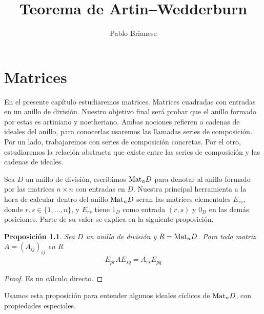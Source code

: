 \documentclass{report}
\title{Teorema de Artin--Wedderburn}
\author{Pablo Brianese}
\newcommand{\Mat}{\textnormal{Mat}}
\newtheorem{proposition}{Proposición}
\begin{document}
  \maketitle
  \tableofcontents
  \chapter{Matrices}

  En el presente capítulo estudiaremos matrices.
  Matrices cuadradas con entradas en un anillo de división.
  Nuestro objetivo final será probar que el anillo formado por estas es artiniano y noetheriano.
  Ambas nociones refieren a cadenas de ideales del anillo, para conocerlas usaremos las llamadas series de composición.
  Por un lado, trabajaremos con series de composición concretas.
  Por el otro, estudiaremos la relación abstracta que existe entre las series de composición y las cadenas de ideales.

  Sea \(D\) un anillo de división, escribimos \(\Mat_n D\) para denotar al anillo formado por las matrices \(n \times n\) con entradas en \(D\).
  Nuestra principal herramienta a la hora de calcular dentro del anillo \(\Mat_n D\) seran las matrices elementales \(E_{r s}\), donde \(r, s \in \{1, \dots, n\}\), y \(E_{r s}\) tiene \(1_D\) como entrada \((r, s)\) y \(0_D\) en las demás posiciones.
  Parte de su valor se explica en la siguiente proposición.
  \begin{proposition}
    \label{proposition:matrixEntryCalculation}
    Sea \(D\) un anillo de división y \(R = \Mat_n D\).
    Para toda matriz \(A = (A_{i j})_{i j}\) en \(R\)
    \begin{align}
      E_{p r} A E_{s q}
      =
      A_{r s} E_{p q}
    \end{align}
  \end{proposition}
  \begin{proof}
    Es un cálculo directo.
  \end{proof}

  Usamos esta proposición para entender algunos ideales cíclicos de \(\Mat_n D\), con propiedades especiales.
\end{document}
